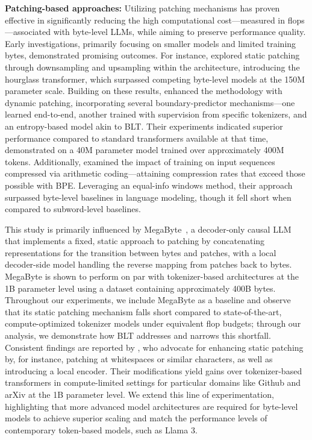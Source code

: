 \textbf{Patching-based approaches:} Utilizing patching mechanisms has proven effective in significantly reducing the high computational cost—measured in flops—associated with byte-level LLMs, while aiming to preserve performance quality. Early investigations, primarily focusing on smaller models and limited training bytes, demonstrated promising outcomes. For instance, \cite{nawrot-etal-2022-hierarchical} explored static patching through downsampling and upsampling within the architecture, introducing the hourglass transformer, which surpassed competing byte-level models at the 150M parameter scale. Building on these results, \cite{nawrot-etal-2023-efficient} enhanced the methodology with dynamic patching, incorporating several boundary-predictor mechanisms—one learned end-to-end, another trained with supervision from specific tokenizers, and an entropy-based model akin to {\textsc BLT}. Their experiments indicated superior performance compared to standard transformers available at that time, demonstrated on a 40M parameter model trained over approximately 400M tokens. Additionally, \cite{lester2024training} examined the impact of training on input sequences compressed via arithmetic coding—attaining compression rates that exceed those possible with BPE. Leveraging an equal-info windows method, their approach surpassed byte-level baselines in language modeling, though it fell short when compared to subword-level baselines.

This study is primarily influenced by MegaByte~\citep{yu2023megabyte}, a decoder-only causal LLM that implements a fixed, static approach to patching by concatenating representations for the transition between bytes and patches, with a local decoder-side model handling the reverse mapping from patches back to bytes. MegaByte is shown to perform on par with tokenizer-based architectures at the 1B parameter level using a dataset containing approximately 400B bytes. Throughout our experiments, we include MegaByte as a baseline and observe that its static patching mechanism falls short compared to state-of-the-art, compute-optimized tokenizer models under equivalent flop budgets; through our analysis, we demonstrate how {\textsc BLT} addresses and narrows this shortfall. Consistent findings are reported by \cite{slagle2024spacebyte}, who advocate for enhancing static patching by, for instance, patching at whitespaces or similar characters, as well as introducing a local encoder. Their modifications yield gains over tokenizer-based transformers in compute-limited settings for particular domains like Github and arXiv at the 1B parameter level. We extend this line of experimentation, highlighting that more advanced model architectures are required for byte-level models to achieve superior scaling and match the performance levels of contemporary token-based models, such as Llama 3.

